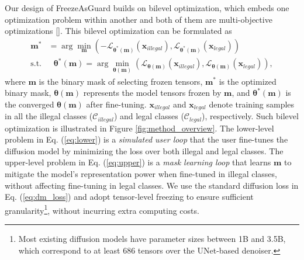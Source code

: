 \documentclass{article}
\begin{document}
Our design of FreezeAsGuard builds on bilevel optimization, which embeds one optimization problem within another and both of them are multi-objective optimizations []. This bilevel optimization can be formulated as 
\begin{align}
\mathbf{m}^{*} &= \arg \min_{\mathbf{m}} \left(
-\mathcal{L}_{\boldsymbol{\theta}^{*}(\mathbf{m})}(\mathbf{x}_{illegal}),
\mathcal{L}_{\boldsymbol{\theta}^{*}(\mathbf{m})}(\mathbf{x}_{legal})
\right) \label{eq:upper}
\\
\text{s.t.} & \ \ \ \boldsymbol{\theta}^{*}(\mathbf{m}) = \arg \min_{\boldsymbol{\theta}(\mathbf{m})} \left(
\mathcal{L}_{\boldsymbol{\theta}(\mathbf{m})}(\mathbf{x}_{illegal}),
\mathcal{L}_{\boldsymbol{\theta}(\mathbf{m})}(\mathbf{x}_{legal})
\right), \label{eq:lower}
\end{align}
where $\mathbf{m}$ is the binary mask of selecting frozen tensors, $\mathbf{m}^*$ is the optimized binary mask, $\boldsymbol{\theta}(\mathbf{m})$ represents the model tensors frozen by $\mathbf{m}$, and $\boldsymbol{\theta}^*(\mathbf{m})$ is the converged $\boldsymbol{\theta}(\mathbf{m})$ after fine-tuning. $\mathbf{x}_{illegal}$ and $\mathbf{x}_{legal}$ denote training samples in all the illegal classes ($\mathcal{C}_{illegal}$) and legal classes ($\mathcal{C}_{legal}$), respectively.  
Such bilevel optimization is illustrated in Figure \ref{fig:method_overview}. The lower-level problem in Eq. (\ref{eq:lower}) is a \emph{simulated user loop} that the user fine-tunes the diffusion model by minimizing the loss over both illegal and legal classes. The upper-level problem in Eq. (\ref{eq:upper}) is a \emph{mask learning loop} that learns $\mathbf{m}$ to mitigate the model's representation power when fine-tuned in illegal classes, without affecting fine-tuning in legal classes. 
We use the standard diffusion loss in Eq. (\ref{eq:dm_loss}) and adopt tensor-level freezing to ensure sufficient granularity\footnote{Most existing diffusion models have parameter sizes between 1B and 3.5B, which correspond to at least 686 tensors over the UNet-based denoiser.}, 
without incurring extra computing costs.
\end{document}

